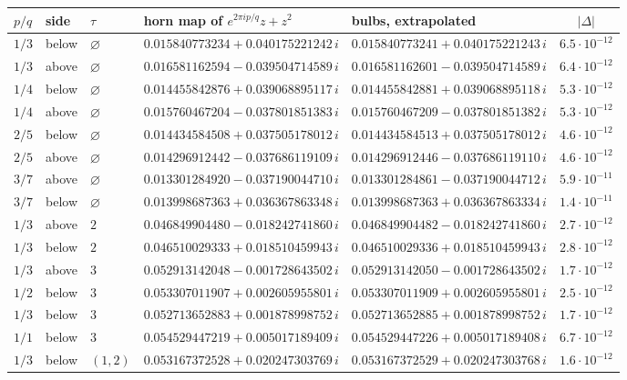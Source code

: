 \begin{tabular}{@{}lllllc@{}}
\toprule
$p/q$ & side & $\tau$ & horn map of $e^{2\pi ip/q}z+z^2$ & bulbs, extrapolated & $|\Delta|$ \\
\midrule
$1/3$ & below & $\varnothing$ & $0.015840773234 + 0.040175221242\,i$ & $0.015840773241 + 0.040175221243\,i$ & $6.5\cdot10^{-12}$ \\
$1/3$ & above & $\varnothing$ & $0.016581162594 - 0.039504714589\,i$ & $0.016581162601 - 0.039504714589\,i$ & $6.4\cdot10^{-12}$ \\
$1/4$ & below & $\varnothing$ & $0.014455842876 + 0.039068895117\,i$ & $0.014455842881 + 0.039068895118\,i$ & $5.3\cdot10^{-12}$ \\
$1/4$ & above & $\varnothing$ & $0.015760467204 - 0.037801851383\,i$ & $0.015760467209 - 0.037801851382\,i$ & $5.3\cdot10^{-12}$ \\
$2/5$ & below & $\varnothing$ & $0.014434584508 + 0.037505178012\,i$ & $0.014434584513 + 0.037505178012\,i$ & $4.6\cdot10^{-12}$ \\
$2/5$ & above & $\varnothing$ & $0.014296912442 - 0.037686119109\,i$ & $0.014296912446 - 0.037686119110\,i$ & $4.6\cdot10^{-12}$ \\
$3/7$ & above & $\varnothing$ & $0.013301284920 - 0.037190044710\,i$ & $0.013301284861 - 0.037190044712\,i$ & $5.9\cdot10^{-11}$ \\
$3/7$ & below & $\varnothing$ & $0.013998687363 + 0.036367863348\,i$ & $0.013998687363 + 0.036367863334\,i$ & $1.4\cdot10^{-11}$ \\
$1/3$ & above & $2$ & $0.046849904480 - 0.018242741860\,i$ & $0.046849904482 - 0.018242741860\,i$ & $2.7\cdot10^{-12}$ \\
$1/3$ & below & $2$ & $0.046510029333 + 0.018510459943\,i$ & $0.046510029336 + 0.018510459943\,i$ & $2.8\cdot10^{-12}$ \\
$1/3$ & above & $3$ & $0.052913142048 - 0.001728643502\,i$ & $0.052913142050 - 0.001728643502\,i$ & $1.7\cdot10^{-12}$ \\
$1/2$ & below & $3$ & $0.053307011907 + 0.002605955801\,i$ & $0.053307011909 + 0.002605955801\,i$ & $2.5\cdot10^{-12}$ \\
$1/3$ & below & $3$ & $0.052713652883 + 0.001878998752\,i$ & $0.052713652885 + 0.001878998752\,i$ & $1.7\cdot10^{-12}$ \\
$1/1$ & below & $3$ & $0.054529447219 + 0.005017189409\,i$ & $0.054529447226 + 0.005017189408\,i$ & $6.7\cdot10^{-12}$ \\
$1/3$ & below & $(1,2)$ & $0.053167372528 + 0.020247303769\,i$ & $0.053167372529 + 0.020247303768\,i$ & $1.6\cdot10^{-12}$ \\
\bottomrule
\end{tabular}
